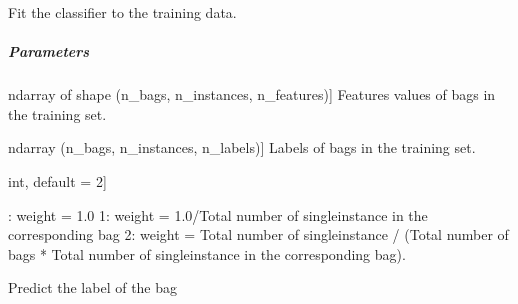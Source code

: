 \documentclass[letterpaper,10pt,english]{sphinxmanual}
\begin{document}
\begin{fulllineitems}
\begin{fulllineitems}
\label{\detokenize{classifier/mi/_autosummary/miml.classifier.mi.mi_wrapper_classifier.MIWrapperClassifier:miml.classifier.mi.mi_wrapper_classifier.MIWrapperClassifier.fit}}
\pysigstartsignatures
{}
\pysigstopsignatures
\sphinxAtStartPar
Fit the classifier to the training data.


\subparagraph{Parameters}
\label{\detokenize{classifier/mi/_autosummary/miml.classifier.mi.mi_wrapper_classifier.MIWrapperClassifier:parameters}}\begin{description}
\sphinxlineitem{x\_train}{[}ndarray of shape (n\_bags, n\_instances, n\_features){]}
\sphinxAtStartPar
Features values of bags in the training set.

\sphinxlineitem{y\_train}{[}ndarray (n\_bags, n\_instances, n\_labels){]}
\sphinxAtStartPar
Labels of bags in the training set.

\sphinxlineitem{weight}{[}int, default = 2{]}\begin{description}
: weight = 1.0
1: weight = 1.0/Total number of single\sphinxhyphen{}instance in the corresponding bag
2: weight = Total number of single\sphinxhyphen{}instance / (Total number of bags * Total number of single\sphinxhyphen{}instance in
the corresponding bag).

\end{description}

\end{description}

\end{fulllineitems}


\begin{fulllineitems}
\label{\detokenize{classifier/mi/_autosummary/miml.classifier.mi.mi_wrapper_classifier.MIWrapperClassifier:miml.classifier.mi.mi_wrapper_classifier.MIWrapperClassifier.predict}}
\pysigstartsignatures
{}
\pysigstopsignatures
\sphinxAtStartPar
Predict the label of the bag



\end{fulllineitems}
\end{fulllineitems}
\end{document}
